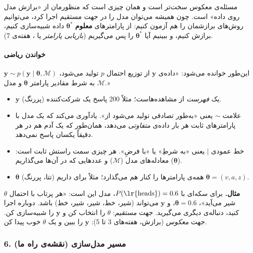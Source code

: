 مسئله‌ی معکوس سخت‌تر است و همان چیزی است که منظورمان از «برازش مدل روی
داده» است. چون همیشه می‌توان مدل را در جهت مستقیم اجرا کرد، می‌توانیم
روش‌های برازشمان را هم آزمون کنیم: از پارامترهای \textbf{معلوم}
\(\boldsymbol\theta^\ast\) داده شبیه‌سازی کنیم، برازش کنیم، و ببینیم آیا
\(\boldsymbol\theta^\ast\) را پس می‌گیریم (\emph{بازیابی پارامتر} یا
، هفته‌ی 7).

\paragraph{خواندن ریاضی}

\(\mathbf{y} \sim p(\mathbf{y} \mid \boldsymbol{\theta},\allowbreak \mathcal{M})\)
این‌طور خوانده می‌شود: «داده‌ی \(\mathbf{y}\) از توزیع احتمال \(p\) تولید
می‌شود، به شرط مقادیر پارامتر \(\boldsymbol\theta\) و مدل
\(\mathcal{M}\).»

\begin{itemize}
\tightlist
\item
  \(\mathbf{y}\) (پررنگ) یک \emph{فهرست} از مشاهده‌هاست؛ مثلاً 200 پاسخ یک
  شرکت‌کننده.
\item
  علامت \(\sim\) یعنی «به‌طور تصادفی تولید می‌شود از». یادآوری می‌کند که یک
  مدل با پارامترهای ثابت هر بار داده‌ی \emph{متفاوتی} می‌دهد، همان‌طور که
  یک آدم هم در هر  دقیقاً یکسان پاسخ نمی‌دهد.
\item
  خط عمودی \(\mid\) یعنی «به شرطِ» یا «با فرضِ». هر چیزی سمت راستش ثابت
  است: معادله‌های مدل (\(\mathcal{M}\)) و عددهایی که در آن‌ها می‌گذاریم
  (\(\boldsymbol\theta\)).
\item
  \(\boldsymbol\theta\) (تتا، پررنگ) همه‌ی پارامترها را کنار هم می‌گذارد؛
  مثلاً برای  داریم \(\boldsymbol\theta = (v, a, z)\).
\end{itemize}

\textbf{مثال.} برای سکه‌ای با \(P(\text{\lr{heads}}) = 0.6\)، مدل این است: «هر
پرتاب با احتمال \(\theta\) شیر می‌آید»، \(\boldsymbol\theta = 0.6\)، و
\(\mathbf{y}\) می‌تواند (شیر، خط، شیر، شیر، خط) باشد. دوباره اجرا کنید،
دنباله‌ی دیگری می‌گیرید. جهت \emph{مستقیم}: \(\theta\) را انتخاب کن و
\(\mathbf{y}\) را شبیه‌سازی کن. جهت \emph{معکوس} (برازش، هفته‌های 3 تا 5):
\(\mathbf{y}\) را ببین و یک \(\theta\) خوب پیدا کن.

\subsubsection{6. مسیر مدل‌سازی (نقشه‌ی راه ما)}




